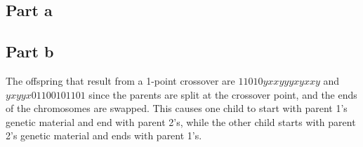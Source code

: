 \documentclass[a4paper]{article}
\begin{document}
\subsection{Part a}

\subsection{Part b}
The offspring that result from a 1-point crossover are $11010yxxyyyxyxxy$ and $yxyyx01100101101$ since the parents are split at the crossover point, and the ends of the chromosomes are swapped.  This causes one child to start with parent 1's genetic material and end with parent 2's, while the other child starts with parent 2's genetic material and ends with parent 1's.
\end{document}

